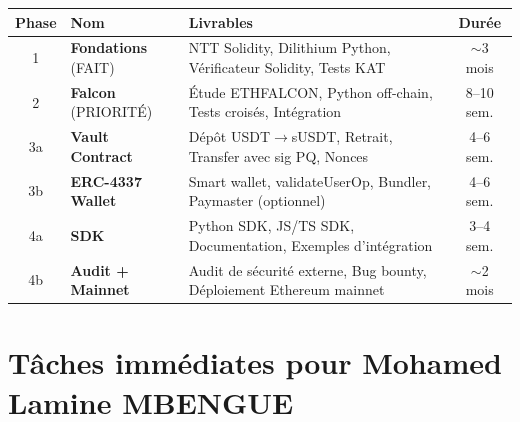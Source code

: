 \documentclass[12pt, a4paper]{article}
\begin{document}
\begin{center}
\renewcommand{\arraystretch}{1.5}
\begin{tabular}{|c|p{4cm}|p{7cm}|c|}
\hline
\rowcolor{suva_blue!20}
\textbf{Phase} & \textbf{Nom} & \textbf{Livrables} & \textbf{Durée} \\
\hline
\rowcolor{done_bg}
1 & \textbf{Fondations} (FAIT) &
NTT Solidity, Dilithium Python, Vérificateur Solidity, Tests KAT &
$\sim$3 mois \\
\hline
\rowcolor{inprog_bg}
2 & \textbf{Falcon} (PRIORITÉ) &
Étude ETHFALCON, Python off-chain, Tests croisés, Intégration &
8--10 sem. \\
\hline
\rowcolor{todo_bg}
3a & \textbf{Vault Contract} &
Dépôt USDT$\to$sUSDT, Retrait, Transfer avec sig PQ, Nonces &
4--6 sem. \\
\hline
\rowcolor{todo_bg}
3b & \textbf{ERC-4337 Wallet} &
Smart wallet, validateUserOp, Bundler, Paymaster (optionnel) &
4--6 sem. \\
\hline
\rowcolor{todo_bg}
4a & \textbf{SDK} &
Python SDK, JS/TS SDK, Documentation, Exemples d'intégration &
3--4 sem. \\
\hline
\rowcolor{todo_bg}
4b & \textbf{Audit + Mainnet} &
Audit de sécurité externe, Bug bounty, Déploiement Ethereum mainnet &
$\sim$2 mois \\
\hline
\end{tabular}
\end{center}

\newpage
\section{Tâches immédiates pour Mohamed Lamine MBENGUE}
\end{document}
